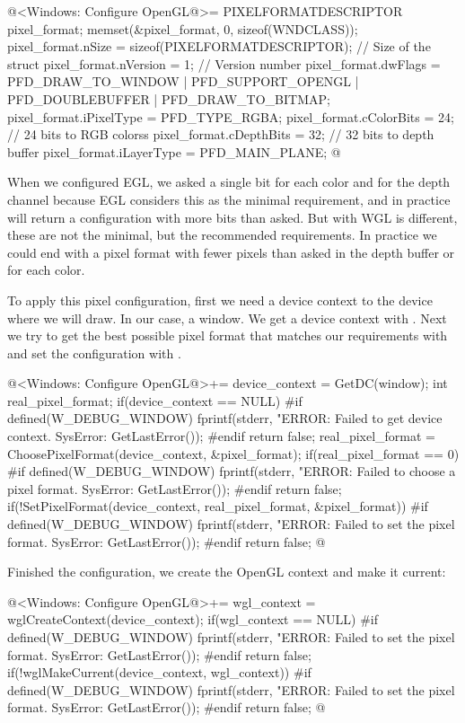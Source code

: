 \iniciocodigo
@<Windows: Configure OpenGL@>=
PIXELFORMATDESCRIPTOR pixel_format;
memset(&pixel_format, 0, sizeof(WNDCLASS));
pixel_format.nSize = sizeof(PIXELFORMATDESCRIPTOR); // Size of the struct
pixel_format.nVersion = 1; // Version number
pixel_format.dwFlags = PFD_DRAW_TO_WINDOW | PFD_SUPPORT_OPENGL |
                       PFD_DOUBLEBUFFER | PFD_DRAW_TO_BITMAP;
pixel_format.iPixelType = PFD_TYPE_RGBA;
pixel_format.cColorBits = 24; // 24 bits to RGB colorss
pixel_format.cDepthBits = 32; // 32 bits to depth buffer
pixel_format.iLayerType = PFD_MAIN_PLANE;
@
\fimcodigo

When we configured EGL, we asked a single bit for each color and for
the depth channel because EGL considers this as the minimal
requirement, and in practice will return a configuration with more
bits than asked. But with WGL is different, these are not the minimal,
but the recommended requirements. In practice we could end with a
pixel format with fewer pixels than asked in the depth buffer or for
each color.

To apply this pixel configuration, first we need a device context to
the device where we will draw. In our case, a window. We get a device
context with . Next we try to get the best possible
pixel format that matches our requirements
with  and set the configuration with
.

\iniciocodigo
@<Windows: Configure OpenGL@>+=
{
  device_context = GetDC(window);
  int real_pixel_format;
  if(device_context == NULL){
#if defined(W_DEBUG_WINDOW)
    fprintf(stderr, "ERROR: Failed to get device context. SysError: %
            GetLastError());
#endif
    return false;
  }
  real_pixel_format = ChoosePixelFormat(device_context, &pixel_format);
  if(real_pixel_format == 0){
#if defined(W_DEBUG_WINDOW)
    fprintf(stderr, "ERROR: Failed to choose a pixel format. SysError: %
            GetLastError());
#endif
    return false;
  }
  if(!SetPixelFormat(device_context, real_pixel_format, &pixel_format)){
#if defined(W_DEBUG_WINDOW)
    fprintf(stderr, "ERROR: Failed to set the pixel format. SysError: %
            GetLastError());
#endif
    return false;
  }
}
@
\fimcodigo

Finished the configuration, we create the OpenGL context and make it
current:

\iniciocodigo
@<Windows: Configure OpenGL@>+=
wgl_context = wglCreateContext(device_context);
if(wgl_context == NULL){
#if defined(W_DEBUG_WINDOW)
  fprintf(stderr, "ERROR: Failed to set the pixel format. SysError: %
          GetLastError());
#endif
  return false;
}
if(!wglMakeCurrent(device_context, wgl_context)){
#if defined(W_DEBUG_WINDOW)
  fprintf(stderr, "ERROR: Failed to set the pixel format. SysError: %
          GetLastError());
#endif
  return false;
}
@
\fimcodigo

